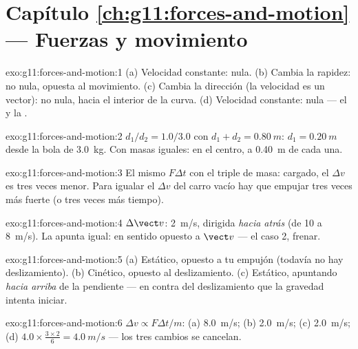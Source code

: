 \section*{Capítulo \ref{ch:g11:forces-and-motion} --- Fuerzas y movimiento}

\begin{solution}{exo:g11:forces-and-motion:1}
(a) Velocidad constante:  nula. (b) Cambia la rapidez: no
nula, opuesta al movimiento. (c) Cambia la dirección (la velocidad es un
vector): no nula, hacia el interior de la curva. (d) Velocidad
constante: nula --- el  y la  .
\end{solution}

\begin{solution}{exo:g11:forces-and-motion:2}
$d_1/d_2 = 1.0/3.0$ con $d_1 + d_2 = \qty{0.80}{m}$:
$d_1 = \qty{0.20}{m}$ desde la bola de \qty{3.0}{kg}. Con masas iguales:
en el centro, a \qty{0.40}{m} de cada una.
\end{solution}

\begin{solution}{exo:g11:forces-and-motion:3}
El mismo $F\Delta t$ con el triple de masa: cargado, el $\Delta v$ es
tres veces menor. Para igualar el $\Delta v$ del carro vacío hay que
empujar tres veces más fuerte (o tres veces más tiempo).
\end{solution}

\begin{solution}{exo:g11:forces-and-motion:4}
$\Delta \vect v$: \qty{2}{m/s}, dirigida \emph{hacia atrás} (de
\num{10} a \qty{8}{m/s}). La  apunta igual: en sentido
opuesto a $\vect v$ --- el caso 2, frenar.
\end{solution}

\begin{solution}{exo:g11:forces-and-motion:5}
(a) Estático, opuesto a tu empujón (todavía no hay deslizamiento). (b)
Cinético, opuesto al deslizamiento. (c) Estático, apuntando \emph{hacia
arriba} de la pendiente --- en contra del deslizamiento que la gravedad
intenta iniciar.
\end{solution}

\begin{solution}{exo:g11:forces-and-motion:6}
$\Delta v \propto F\Delta t/m$: (a) \qty{8.0}{m/s}; (b) \qty{2.0}{m/s};
(c) \qty{2.0}{m/s}; (d)
$4.0 \times \frac{3 \times 2}{6} = \qty{4.0}{m/s}$ --- los tres cambios
se cancelan.
\end{solution}

